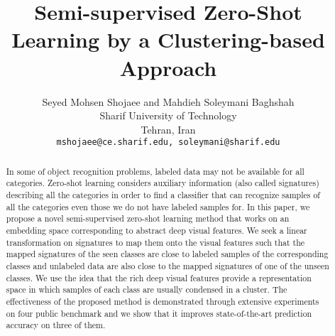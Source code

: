 \documentclass[10pt,twocolumn,letterpaper]{article}
\begin{document}
\title{Semi-supervised Zero-Shot Learning by a Clustering-based Approach}
 \author{Seyed Mohsen Shojaee and Mahdieh Soleymani Baghshah\\
 Sharif University of Technology \\
 Tehran, Iran\\
 {\tt\small mshojaee@ce.sharif.edu, soleymani@sharif.edu}
 }

\maketitle

\begin{abstract}
In some of object recognition problems, labeled data may not be available for all categories.
 Zero-shot learning considers auxiliary information (also called signatures)
 describing all the categories in order to find a classifier that can recognize samples of all the categories
 even those we do not have labeled samples for. %
In this paper, we propose a novel semi-supervised zero-shot learning method that works on an embedding space corresponding to
abstract deep visual features. We seek a linear transformation on signatures to map them onto the visual features such that the mapped signatures of the seen classes are close to labeled samples of the corresponding
classes and unlabeled data are also close to the mapped signatures of one of the unseen classes.
 We use the idea that the rich deep visual features provide a representation
 space in which samples of each class are usually condensed in a cluster. The effectiveness of the proposed method is demonstrated through extensive
experiments on four public benchmark and we show that it improves state-of-the-art prediction accuracy on three of them.
\end{abstract}
\end{document}
